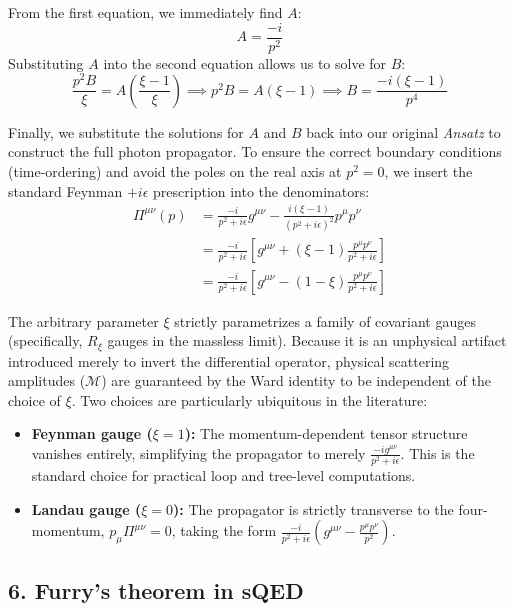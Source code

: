 From the first equation, we immediately find $A$:
\[
    A = \frac{-i}{p^2}
\]
Substituting $A$ into the second equation allows us to solve for $B$:
\[
    \frac{p^2 B}{\xi} = A \left( \frac{\xi - 1}{\xi} \right) \implies p^2 B = A(\xi - 1) \implies B = \frac{-i(\xi - 1)}{p^4}
\]

Finally, we substitute the solutions for $A$ and $B$ back into our original \textit{Ansatz} to construct the full photon propagator. To ensure the correct boundary conditions (time-ordering) and avoid the poles on the real axis at $p^2=0$, we insert the standard Feynman $+i\epsilon$ prescription into the denominators:
\[
    \begin{aligned}
        \Pi^{\mu\nu}(p) & = \frac{-i}{p^2 + i\epsilon} g^{\mu\nu} - \frac{i(\xi - 1)}{(p^2 + i\epsilon)^2} p^\mu p^\nu           \\
                        & = \frac{-i}{p^2 + i\epsilon} \left[ g^{\mu\nu} + (\xi - 1) \frac{p^\mu p^\nu}{p^2 + i\epsilon} \right] \\
                        & = \frac{-i}{p^2 + i\epsilon} \left[ g^{\mu\nu} - (1 - \xi) \frac{p^\mu p^\nu}{p^2 + i\epsilon} \right]
    \end{aligned}
\]

\begin{remark}
    The arbitrary parameter $\xi$ strictly parametrizes a family of covariant gauges (specifically, $R_\xi$ gauges in the massless limit). Because it is an unphysical artifact introduced merely to invert the differential operator, physical scattering amplitudes ($\mathcal{M}$) are guaranteed by the Ward identity to be independent of the choice of $\xi$. Two choices are particularly ubiquitous in the literature:
    \begin{itemize}
        \item \textbf{Feynman gauge ($\xi = 1$):} The momentum-dependent tensor structure vanishes entirely, simplifying the propagator to merely $\frac{-i g^{\mu\nu}}{p^2 + i\epsilon}$. This is the standard choice for practical loop and tree-level computations.
        \item \textbf{Landau gauge ($\xi = 0$):} The propagator is strictly transverse to the four-momentum, $p_\mu \Pi^{\mu\nu} = 0$, taking the form $\frac{-i}{p^2 + i\epsilon} \left( g^{\mu\nu} - \frac{p^\mu p^\nu}{p^2} \right)$.
    \end{itemize}
\end{remark}


\subsection*{6. Furry's theorem in sQED}

